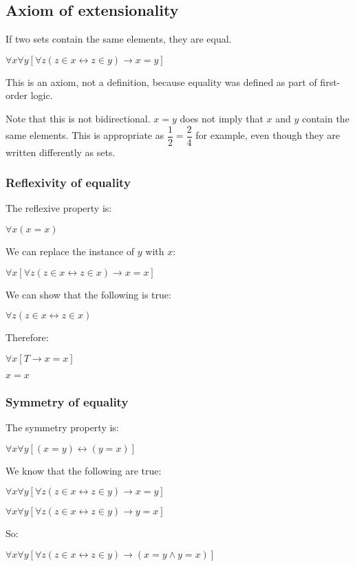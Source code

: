 
\subsection{Axiom of extensionality}

If two sets contain the same elements, they are equal.

\(\forall x \forall y[\forall z(z\in x \leftrightarrow z\in y)\rightarrow x=y]\)

This is an axiom, not a definition, because equality was defined as part of first-order logic.

Note that this is not bidirectional. \(x=y\) does not imply that \(x\) and \(y\) contain the same elements. This is appropriate as \(\dfrac{1}{2}= \dfrac{2}{4}\) for example, even though they are written differently as sets.

\subsubsection{Reflexivity of equality}

The reflexive property is:

\(\forall x(x=x)\)

We can replace the instance of \(y\)  with \(x\):

\(\forall x [\forall z(z\in x \leftrightarrow z\in x)\rightarrow x=x]\)

We can show that the following is true:

\(\forall z(z\in x \leftrightarrow z\in x)\)

Therefore:

\(\forall x [T \rightarrow x=x]\)

\(x=x\)

\subsubsection{Symmetry of equality}

The symmetry property is:

\(\forall x \forall y[(x=y)\leftrightarrow (y=x)]\)

We know that the following are true:

\(\forall x \forall y[\forall z(z\in x \leftrightarrow z\in y)\rightarrow x=y]\)

\(\forall x \forall y[\forall z(z\in x \leftrightarrow z\in y)\rightarrow y=x]\)

So:

\(\forall x \forall y[\forall z(z\in x \leftrightarrow z\in y)\rightarrow (x=y\land y=x)]\)


